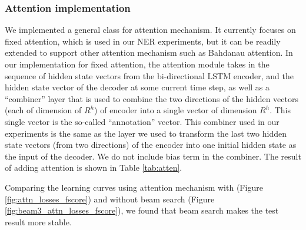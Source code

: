 \documentclass[11pt,a4paper]{article}
\begin{document}




\subsubsection{Attention implementation}

	We implemented a general class for attention mechanism. It currently focuses on fixed attention, which is used in our NER experiments, but it can be readily extended to support other attention mechanism such as Bahdanau attention. In our implementation for fixed attention, the attention module takes in the sequence of hidden state vectors from the bi-directional LSTM encoder, and the hidden state vector of the decoder at some current time step, as well as a ``combiner'' layer that is used to combine the two directions of the hidden vectors (each of dimension of $R^h$) of encoder into a single vector of dimension $R^h$. This single vector is the so-called ``annotation'' vector. This combiner used in our experiments is the same as the layer we used to transform the last two hidden state vectors (from two directions) of the encoder into one initial hidden state as the input of the decoder. We do not include bias term in the combiner. The result of adding attention is shown in Table \ref{tab:atten}.

Comparing the learning curves using attention mechanism with (Figure \ref{fig:attn_losses_fscore}) and without beam search (Figure \ref{fig:beam3_attn_losses_fscore}), we found that beam search makes the test result more stable.
\end{document}
